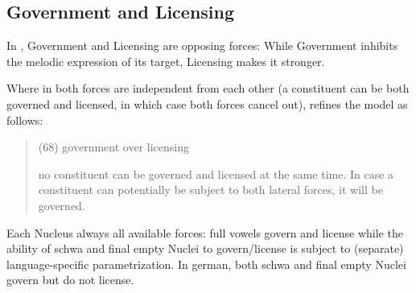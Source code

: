 \subsection{Government and Licensing}

In \CVCV, Government and Licensing are opposing forces:
While Government inhibits the melodic expression of
its target, Licensing makes it stronger.

Where in \cite{scheer2004} both forces are independent
from each other (a constituent can be both governed
and licensed, in which case both forces cancel out),
\cite{scheer2012} refines the model as follows:
\blockquote[\cite{scheer2012}]{
  (68) government over licensing
  
  no constituent can be governed and licensed at the
  same time. In case a constituent can potentially be
  subject to both lateral forces, it will be governed.
}

Each Nucleus always 
all available forces: full vowels govern and license
while the ability of schwa and final empty Nuclei to
govern/license is subject to (separate) language-specific
parametrization.
In german, both schwa and final empty Nuclei govern but
do not license.